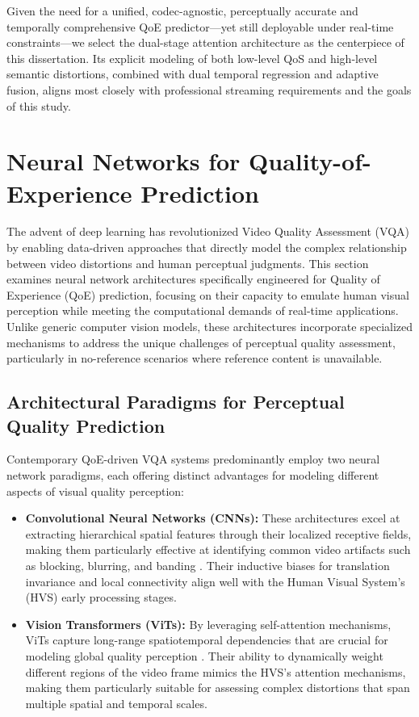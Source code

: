 Given the need for a unified, codec-agnostic, perceptually accurate and temporally comprehensive QoE predictor—yet still deployable under real-time constraints—we select the dual-stage attention architecture as the centerpiece of this dissertation. Its explicit modeling of both low-level QoS and high-level semantic distortions, combined with dual temporal regression and adaptive fusion, aligns most closely with professional streaming requirements and the goals of this study.  

\section{Neural Networks for Quality-of-Experience Prediction}  
\label{sec:nn_qoe}  

The advent of deep learning has revolutionized Video Quality Assessment (VQA) by enabling data-driven approaches that directly model the complex relationship between video distortions and human perceptual judgments. This section examines neural network architectures specifically engineered for Quality of Experience (QoE) prediction, focusing on their capacity to emulate human visual perception while meeting the computational demands of real-time applications. Unlike generic computer vision models, these architectures incorporate specialized mechanisms to address the unique challenges of perceptual quality assessment, particularly in no-reference scenarios where reference content is unavailable.

\subsection{Architectural Paradigms for Perceptual Quality Prediction}  
Contemporary QoE-driven VQA systems predominantly employ two neural network paradigms, each offering distinct advantages for modeling different aspects of visual quality perception:

\begin{itemize}  
    \item \textbf{Convolutional Neural Networks (CNNs):} These architectures excel at extracting hierarchical spatial features through their localized receptive fields, making them particularly effective at identifying common video artifacts such as blocking, blurring, and banding \cite{he2016deep}. Their inductive biases for translation invariance and local connectivity align well with the Human Visual System's (HVS) early processing stages.
    
    \item \textbf{Vision Transformers (ViTs):} By leveraging self-attention mechanisms, ViTs capture long-range spatiotemporal dependencies that are crucial for modeling global quality perception \cite{dosovitskiy2020image}. Their ability to dynamically weight different regions of the video frame mimics the HVS's attention mechanisms, making them particularly suitable for assessing complex distortions that span multiple spatial and temporal scales.
\end{itemize}  

